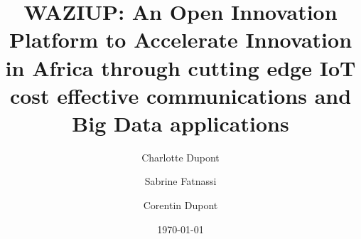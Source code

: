\documentclass{llncs}
\begin{document}
\title{WAZIUP: An Open Innovation Platform to Accelerate Innovation in Africa through cutting edge IoT cost effective communications and Big Data applications}

\author{Charlotte Dupont \and Sabrine Fatnassi \and Corentin Dupont}

\date{\today}

\maketitle

\begin{abstract}

\end{abstract}












\end{document}
